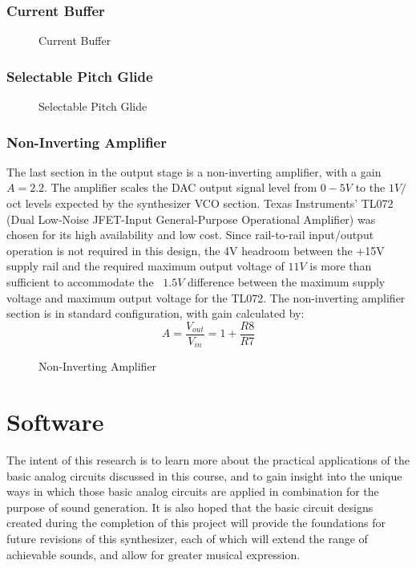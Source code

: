 \documentclass[10pt,a4paper]{article}
\begin{document}
			\subsubsection{Current Buffer}
				\begin{figure}[H]
					\caption{Current Buffer}
					\label{fig:current_buffer}
				\end{figure}
			\subsubsection{Selectable Pitch Glide}
				\begin{figure}[H]
					\caption{Selectable Pitch Glide}
					\label{fig:selectable_pitch_glide}
				\end{figure}

			\subsubsection{Non-Inverting Amplifier}
				The last section in the output stage is a non-inverting amplifier, with a gain $A=2.2$. The amplifier scales the DAC output signal level from $0-5V$ to the $1V/$oct levels expected by the synthesizer VCO section. Texas Instruments' TL072 (Dual Low-Noise JFET-Input General-Purpose Operational Amplifier) was chosen for its high availability and low cost. Since rail-to-rail input/output operation is not required in this design, the 4V headroom between the +15V supply rail and the required maximum output voltage of $11V$ is more than sufficient to accommodate the ~$1.5V$ difference between the maximum supply voltage and maximum output voltage for the TL072. The non-inverting amplifier section is in standard configuration, with gain calculated by:
				\begin{equation}
					A = \frac{V_{out}}{V_{in}} = 1 + \frac{R8}{R7}
				\end{equation}
				\begin{figure}[H]
					\caption{Non-Inverting Amplifier}
					\label{fig:non-inverting_amplifier}
				\end{figure}

	\section{Software}
		The intent of this research is to learn more about the practical applications of the basic analog circuits discussed in this course, and to gain insight into the unique ways in which those basic analog circuits are applied in combination for the purpose of sound generation. It is also hoped that the basic circuit designs created during the completion of this project will provide the foundations for future revisions of this synthesizer, each of which will extend the range of achievable sounds, and allow for greater musical expression. 
\end{document}
